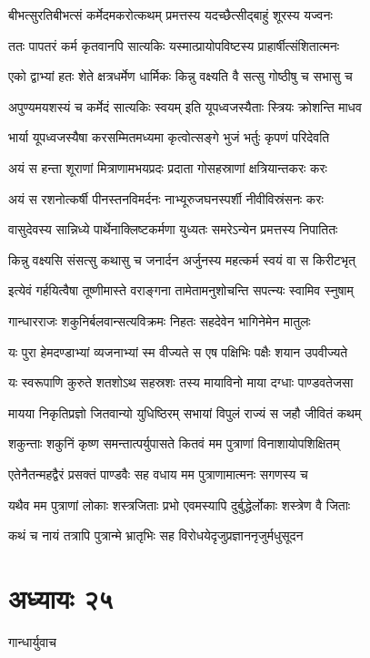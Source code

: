 \twolineshloka
{बीभत्सुरतिबीभत्सं कर्मेदमकरोत्कथम्}
{प्रमत्तस्य यदच्छैत्सीद्बाहुं शूरस्य यज्वनः}


\twolineshloka
{ततः पापतरं कर्म कृतवानपि सात्यकिः}
{यस्मात्प्रायोपविष्टस्य प्राहार्षीत्संशितात्मनः}


\twolineshloka
{एको द्वाभ्यां हतः शेते क्षत्रधर्मेण धार्मिकः}
{किन्नु वक्ष्यति वै सत्सु गोष्ठीषु च सभासु च}


\twolineshloka
{अपुण्यमयशस्यं च कर्मेदं सात्यकिः स्वयम्}
{इति यूपध्वजस्यैताः स्त्रियः क्रोशन्ति माधव}


\twolineshloka
{भार्या यूपध्वजस्यैषा करसम्मितमध्यमा}
{कृत्वोत्सङ्गे भुजं भर्तुः कृपणं परिदेवति}


\twolineshloka
{अयं स हन्ता शूराणां मित्राणामभयप्रदः}
{प्रदाता गोसहस्राणां क्षत्रियान्तकरः करः}


\twolineshloka
{अयं स रशनोत्कर्षी पीनस्तनविमर्दनः}
{नाभ्यूरुजघनस्पर्शी नीवीविस्रंसनः करः}


\twolineshloka
{वासुदेवस्य सान्निध्ये पार्थेनाक्लिष्टकर्मणा}
{युध्यतः समरेऽन्येन प्रमत्तस्य निपातितः}


\twolineshloka
{किन्नु वक्ष्यसि संसत्सु कथासु च जनार्दन}
{अर्जुनस्य महत्कर्म स्वयं वा स किरीटभृत्}


\twolineshloka
{इत्येवं गर्हयित्वैषा तूष्णीमास्ते वराङ्गना}
{तामेतामनुशोचन्ति सपत्न्यः स्वामिव स्नुषाम्}


\twolineshloka
{गान्धारराजः शकुनिर्बलवान्सत्यविक्रमः}
{निहतः सहदेवेन भागिनेमेन मातुलः}


\twolineshloka
{यः पुरा हेमदण्डाभ्यां व्यजनाभ्यां स्म वीज्यते}
{स एष पक्षिभिः पक्षैः शयान उपवीज्यते}


\twolineshloka
{यः स्वरूपाणि कुरुते शतशोऽथ सहस्रशः}
{तस्य मायाविनो माया दग्धाः पाण्डवतेजसा}


\twolineshloka
{मायया निकृतिप्रज्ञो जितवान्यो युधिष्ठिरम्}
{सभायां विपुलं राज्यं स जहौ जीवितं कथम्}


\twolineshloka
{शकुन्ताः शकुनिं कृष्ण समन्तात्पर्युपासते}
{कितवं मम पुत्राणां विनाशायोपशिक्षितम्}


\twolineshloka
{एतेनैतन्महद्वैरं प्रसक्तं पाण्डवैः सह}
{वधाय मम पुत्राणामात्मनः सगणस्य च}


\twolineshloka
{यथैव मम पुत्राणां लोकाः शस्त्रजिताः प्रभो}
{एवमस्यापि दुर्बुद्धेर्लोकाः शस्त्रेण वै जिताः}


\twolineshloka
{कथं च नायं तत्रापि पुत्रान्मे भ्रातृभिः सह}
{विरोधयेदृजुप्रज्ञाननृजुर्मधुसूदन}


\chapter{अध्यायः २५}
\twolineshloka
{गान्धार्युवाच}
{}


